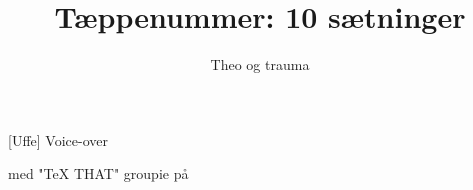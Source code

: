 \documentclass[danish]{article}
\title{Tæppenummer: 10 sætninger}
\author{Theo og trauma}
\begin{document}
\maketitle

\begin{roles}
  [Uffe] Voice-over
\end{roles}

\begin{props}
   med "TeX THAT" groupie på
\end{props}

\begin{sketch}

\end{sketch}
\end{document}
